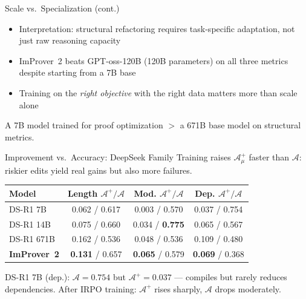 \documentclass{beamer}
\begin{document}
\begin{frame}{Scale vs.\ Specialization (cont.)}
\vspace{0.8em}
\begin{itemize}\setlength{\itemsep}{12pt}
  \item Interpretation: structural refactoring requires task-specific adaptation, not just raw reasoning capacity
  \item ImProver~2 beats GPT-oss-120B (120B parameters) on all three metrics despite starting from a 7B base
  \item Training on the \emph{right objective} with the right data matters more than scale alone
\end{itemize}
\vspace{0.6em}
\begin{alertblock}{}
  \centering A 7B model trained for proof optimization $>$ a 671B base model on structural metrics.
\end{alertblock}
\end{frame}

\begin{frame}{Improvement vs.\ Accuracy: DeepSeek Family}
\vspace{0.3em}
\small Training raises $\mathcal{A}^+_\mu$ faster than $\mathcal{A}$: riskier edits yield real gains but also more failures.
\vspace{0.3em}
\begin{center}
\small
\setlength{\tabcolsep}{4pt}
\begin{tabular}{l|ccc}
\hline
\textbf{Model} & \textbf{Length} $\mathcal{A}^+ / \mathcal{A}$ & \textbf{Mod.} $\mathcal{A}^+ / \mathcal{A}$ & \textbf{Dep.} $\mathcal{A}^+ / \mathcal{A}$\\
\hline
DS-R1 7B      & 0.062 / 0.617 & 0.003 / 0.570 & 0.037 / 0.754\\
DS-R1 14B     & 0.075 / 0.660 & 0.034 / \textbf{0.775} & 0.065 / 0.567\\
DS-R1 671B    & 0.162 / 0.536 & 0.048 / 0.536 & 0.109 / 0.480\\
\hline
\textbf{ImProver~2}    & \textbf{0.131} / 0.657 & \textbf{0.065} / 0.579 & \textbf{0.069} / 0.368\\
\hline
\end{tabular}
\end{center}
\vspace{0.4em}
\small DS-R1 7B (dep.): $\mathcal{A}=0.754$ but $\mathcal{A}^+=0.037$ --- compiles but rarely reduces dependencies. After IRPO training: $\mathcal{A}^+$ rises sharply, $\mathcal{A}$ drops moderately.
\end{frame}
\end{document}
